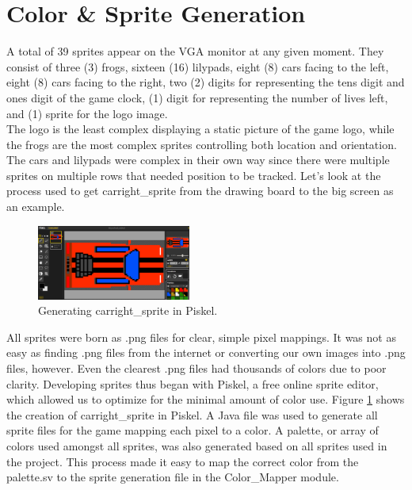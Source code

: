 \documentclass[journal, twocolumn, final,11pt,letterpaper]{IEEEtran}
\begin{document}
\section{Color \& Sprite Generation}
A total of 39 sprites appear on the VGA monitor at any given moment.  They consist of three (3) frogs, sixteen (16) lilypads, eight (8) cars facing to the left, eight (8) cars facing to the right, two (2) digits for representing the tens digit and ones digit of the game clock, (1) digit for representing the number of lives left, and (1) sprite for the logo image.  \\

The logo is the least complex displaying a static picture of the game logo, while the frogs are the most complex sprites controlling both location and orientation. The cars and lilypads were complex in their own way since there were multiple sprites on multiple rows that needed position to be tracked.  Let's look at the process used to get carright\_sprite from the drawing board to the big screen as an example. 

	\begin{figure}[H]
		\centering
		\includegraphics[width=0.45\textwidth]{piskel.png}
		\caption{Generating carright\_sprite in Piskel.}
		\label{fig:piskel}
	\end{figure}  

All sprites were born as .png files for clear, simple pixel mappings.  It was not as easy as finding .png files from the internet or converting our own images into .png files, however.  Even the clearest .png files had thousands of colors due to poor clarity.  Developing sprites thus began with Piskel, a free online sprite editor, which allowed us to optimize for the minimal amount of color use.  Figure \ref{fig:piskel} shows the creation of carright\_sprite in Piskel.  A Java file was used to generate all sprite files for the game mapping each pixel to a color. A palette, or array of colors used amongst all sprites, was also generated based on all sprites used in the project.  This process made it easy to map the correct color from the palette.sv to the sprite generation file in the Color\_Mapper module.
\end{document}
